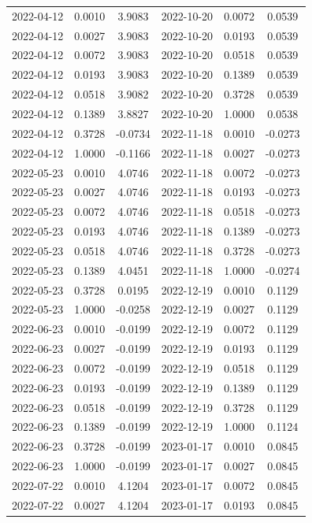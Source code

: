 \begin{footnotesize}
\begin{longtable}{lcc|lcc}
2022-04-12 & 0.0010 & 3.9083 & 2022-10-20 & 0.0072 & 0.0539 \\
2022-04-12 & 0.0027 & 3.9083 & 2022-10-20 & 0.0193 & 0.0539 \\
2022-04-12 & 0.0072 & 3.9083 & 2022-10-20 & 0.0518 & 0.0539 \\
2022-04-12 & 0.0193 & 3.9083 & 2022-10-20 & 0.1389 & 0.0539 \\
2022-04-12 & 0.0518 & 3.9082 & 2022-10-20 & 0.3728 & 0.0539 \\
2022-04-12 & 0.1389 & 3.8827 & 2022-10-20 & 1.0000 & 0.0538 \\
2022-04-12 & 0.3728 & -0.0734 & 2022-11-18 & 0.0010 & -0.0273 \\
2022-04-12 & 1.0000 & -0.1166 & 2022-11-18 & 0.0027 & -0.0273 \\
2022-05-23 & 0.0010 & 4.0746 & 2022-11-18 & 0.0072 & -0.0273 \\
2022-05-23 & 0.0027 & 4.0746 & 2022-11-18 & 0.0193 & -0.0273 \\
2022-05-23 & 0.0072 & 4.0746 & 2022-11-18 & 0.0518 & -0.0273 \\
2022-05-23 & 0.0193 & 4.0746 & 2022-11-18 & 0.1389 & -0.0273 \\
2022-05-23 & 0.0518 & 4.0746 & 2022-11-18 & 0.3728 & -0.0273 \\
2022-05-23 & 0.1389 & 4.0451 & 2022-11-18 & 1.0000 & -0.0274 \\
2022-05-23 & 0.3728 & 0.0195 & 2022-12-19 & 0.0010 & 0.1129 \\
2022-05-23 & 1.0000 & -0.0258 & 2022-12-19 & 0.0027 & 0.1129 \\
2022-06-23 & 0.0010 & -0.0199 & 2022-12-19 & 0.0072 & 0.1129 \\
2022-06-23 & 0.0027 & -0.0199 & 2022-12-19 & 0.0193 & 0.1129 \\
2022-06-23 & 0.0072 & -0.0199 & 2022-12-19 & 0.0518 & 0.1129 \\
2022-06-23 & 0.0193 & -0.0199 & 2022-12-19 & 0.1389 & 0.1129 \\
2022-06-23 & 0.0518 & -0.0199 & 2022-12-19 & 0.3728 & 0.1129 \\
2022-06-23 & 0.1389 & -0.0199 & 2022-12-19 & 1.0000 & 0.1124 \\
2022-06-23 & 0.3728 & -0.0199 & 2023-01-17 & 0.0010 & 0.0845 \\
2022-06-23 & 1.0000 & -0.0199 & 2023-01-17 & 0.0027 & 0.0845 \\
2022-07-22 & 0.0010 & 4.1204 & 2023-01-17 & 0.0072 & 0.0845 \\
2022-07-22 & 0.0027 & 4.1204 & 2023-01-17 & 0.0193 & 0.0845 \\

\end{longtable}
\end{footnotesize}
